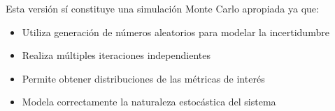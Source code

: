 \documentclass[12pt]{article}
\begin{document}
Esta versión sí constituye una simulación Monte Carlo apropiada ya que:
\begin{itemize}
    \item Utiliza generación de números aleatorios para modelar la incertidumbre
    \item Realiza múltiples iteraciones independientes
    \item Permite obtener distribuciones de las métricas de interés
    \item Modela correctamente la naturaleza estocástica del sistema
\end{itemize}
\end{document}

